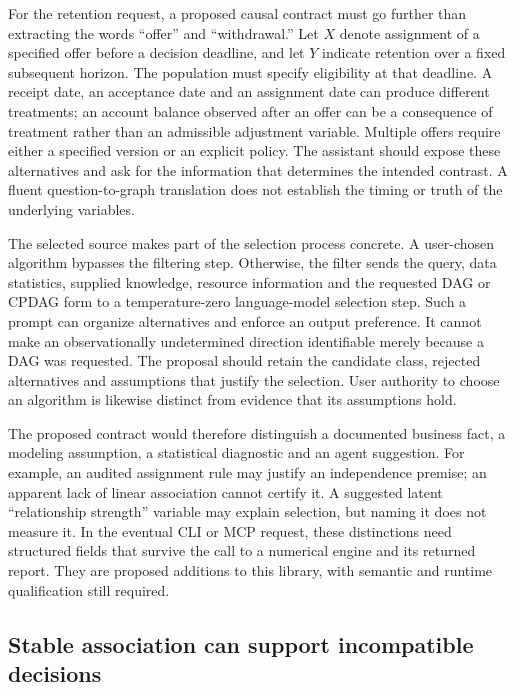 For the retention request, a proposed causal contract must go further than
extracting the words ``offer'' and ``withdrawal.'' Let $X$ denote assignment of
a specified offer before a decision deadline, and let $Y$ indicate retention
over a fixed subsequent horizon. The population must specify eligibility at
that deadline. A receipt date, an acceptance date and an assignment date can
produce different treatments; an account balance observed after an offer can
be a consequence of treatment rather than an admissible adjustment variable.
Multiple offers require either a specified version or an explicit policy.
The assistant should expose these alternatives and ask for the information
that determines the intended contrast. A fluent question-to-graph translation
does not establish the timing or truth of the underlying variables.

The selected source makes part of the selection process concrete. A user-chosen
algorithm bypasses the filtering step. Otherwise, the filter sends the query,
data statistics, supplied knowledge, resource information and the requested
DAG or CPDAG form to a temperature-zero language-model selection step. Such a
prompt can organize alternatives and enforce an output preference. It cannot
make an observationally undetermined direction identifiable merely because a
DAG was requested. The proposal should retain the candidate class, rejected
alternatives and assumptions that justify the selection. User authority to
choose an algorithm is likewise distinct from evidence that its assumptions
hold.\citep{exec17_copilot_code}

The proposed contract would therefore distinguish a documented business fact,
a modeling assumption, a statistical diagnostic and an agent suggestion.
For example, an audited assignment rule may justify an independence premise;
an apparent lack of linear association cannot certify it. A suggested latent
``relationship strength'' variable may explain selection, but naming it does
not measure it. In the eventual CLI or MCP request, these distinctions need
structured fields that survive the call to a numerical engine and its returned
report. They are proposed additions to this library, with semantic and runtime
qualification still required.

\subsection{Stable association can support incompatible decisions}

